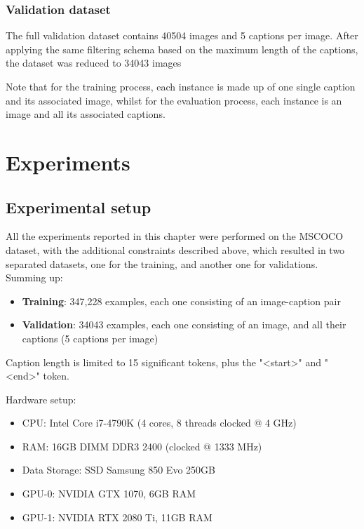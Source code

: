 \subsubsection{Validation dataset}

The full validation dataset contains 40504 images and 5 captions per image. After applying the same filtering schema based on the maximum length of the captions, the dataset was reduced to 34043 images

Note that for the training process, each instance is made up of one single caption and its associated image, whilst for the evaluation process, each instance is an image and all its associated captions. 

\section{Experiments}

\subsection{Experimental setup}

All the experiments reported in this chapter were performed on the MSCOCO dataset, with the additional constraints described above, which resulted in two separated datasets, one for the training, and another one for validations. Summing up:

\begin{itemize}
    \item \textbf{Training}: 347,228 examples, each one consisting of an image-caption pair
    \item \textbf{Validation}: 34043 examples, each one consisting of an image, and all their captions (5 captions per image)
\end{itemize}

Caption length is limited to 15 significant tokens, plus the "<start>" and "<end>" token.

Hardware setup:
\begin{itemize}
    \item CPU: Intel Core i7-4790K (4 cores, 8 threads clocked @ 4 GHz)
    \item RAM: 16GB DIMM DDR3 2400 (clocked @ 1333 MHz)
    \item Data Storage: SSD Samsung 850 Evo 250GB
    \item GPU-0: NVIDIA GTX 1070, 6GB RAM
    \item GPU-1: NVIDIA RTX 2080 Ti, 11GB RAM
\end{itemize}

